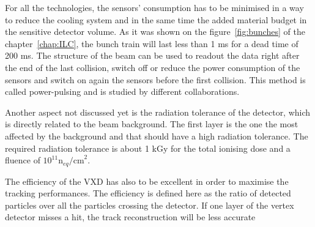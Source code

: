    For all the technologies, the sensors' consumption has to be minimised in a way to reduce the cooling system and in the same time the added material budget in the sensitive detector volume.
   As it was shown on the figure~\ref{fig:bunches} of the chapter~\ref{chap:ILC}, the bunch train will last less than 1 ms for a dead time of 200 ms.
   The structure of the beam can be used to readout the data right after the end of the last collision, switch off or reduce the power consumption of the sensors and switch on again the sensors before the first collision.
   This method is called power-pulsing and is studied by different collaborations.
   
   Another aspect not discussed yet is the radiation tolerance of the detector, which is directly related to the beam background.
   The first layer is the one the most affected by the background and that should have a high radiation tolerance. 
   The required radiation tolerance is about 1 kGy for the total ionising dose and a fluence of $10^{11}\text{n}_{eq}\text{/cm}^2$\cite{Behnke2013}.

   The efficiency of the \gls{VXD} has also to be excellent in order to maximise the tracking performances.
   The efficiency is defined here as the ratio of detected particles over all the particles crossing the detector.
   If one layer of the vertex detector misses a hit, the track reconstruction will be less accurate 
   
  
   
   


